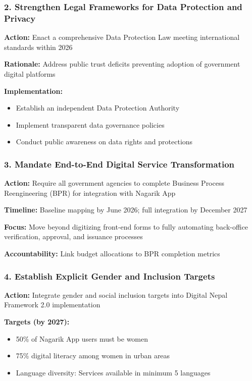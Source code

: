 \documentclass[12pt,a4paper]{article}
\begin{document}
\subsubsection{2. Strengthen Legal Frameworks for Data Protection and Privacy}

\textbf{Action:} Enact a comprehensive Data Protection Law meeting international standards within 2026

\textbf{Rationale:} Address public trust deficits preventing adoption of government digital platforms

\textbf{Implementation:}
\begin{itemize}
    \item Establish an independent Data Protection Authority
    \item Implement transparent data governance policies
    \item Conduct public awareness on data rights and protections
\end{itemize}

\subsubsection{3. Mandate End-to-End Digital Service Transformation}

\textbf{Action:} Require all government agencies to complete Business Process Reengineering (BPR) for integration with Nagarik App

\textbf{Timeline:} Baseline mapping by June 2026; full integration by December 2027

\textbf{Focus:} Move beyond digitizing front-end forms to fully automating back-office verification, approval, and issuance processes

\textbf{Accountability:} Link budget allocations to BPR completion metrics

\subsubsection{4. Establish Explicit Gender and Inclusion Targets}

\textbf{Action:} Integrate gender and social inclusion targets into Digital Nepal Framework 2.0 implementation

\textbf{Targets (by 2027):}
\begin{itemize}
    \item 50\% of Nagarik App users must be women
    \item 75\% digital literacy among women in urban areas
    \item Language diversity: Services available in minimum 5 languages
\end{itemize}
\end{document}
